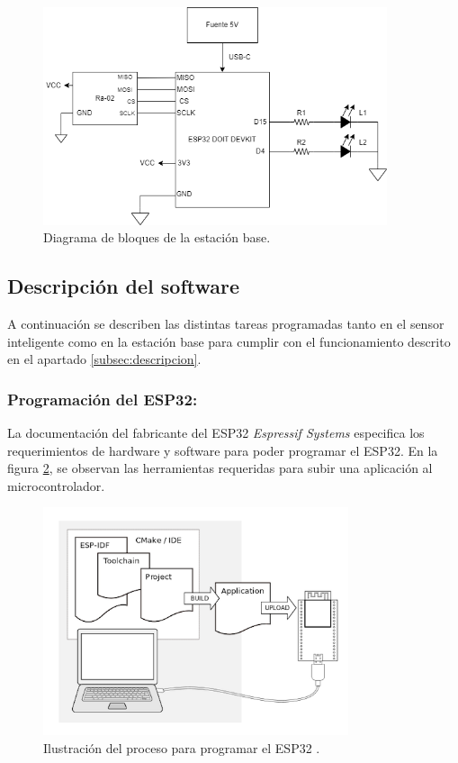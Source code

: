 \begin{figure}[H]
    \centering
    \includegraphics[width = 0.9\textwidth]{imagenes/cap2_marcometod/DiagramaHardwareEstacionBase.png}
    \caption{Diagrama de bloques de la estación base.}
    \label{fig:estacionbbloques}
\end{figure}

\subsection{Descripción del software}
\label{subsec:softwaredesc}

A continuación se describen las distintas tareas programadas tanto en el sensor inteligente como en la estación base para cumplir con el funcionamiento descrito en el apartado \ref{subsec:descripcion}.

\subsubsection{Programación del ESP32:} 

La documentación del fabricante del ESP32 \textit{Espressif Systems} especifica los requerimientos de hardware y software para poder programar el ESP32. En la figura \ref{fig:toolchain}, se observan las herramientas requeridas para subir una aplicación al microcontrolador. 

\begin{figure}[H]
    \centering
    \includegraphics[width = 0.8\textwidth]{imagenes/cap2_marcometod/Toolchain.png}
    \caption{Ilustración del proceso para programar el ESP32 \citep{datasheetESP32}.}
    \label{fig:toolchain}
\end{figure}

